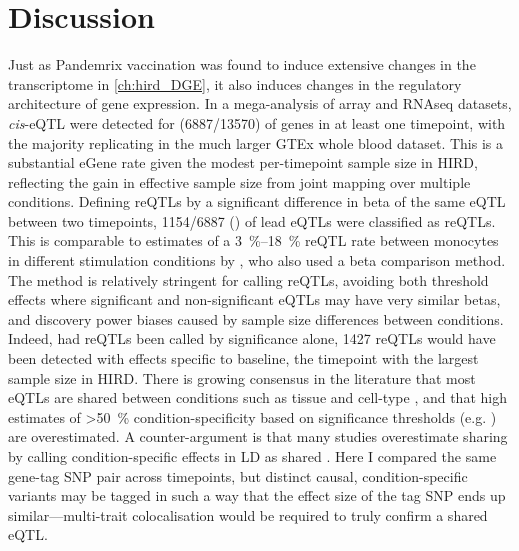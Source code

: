 \section{Discussion}

Just as Pandemrix vaccination was found to induce extensive changes in the transcriptome
in \cref{ch:hird_DGE},
it also induces changes in the regulatory architecture of gene expression.
In a mega-analysis of array and \gls{RNAseq} datasets,
\textit{cis}-\gls{eQTL} were detected for  (\num{6887/13570}) of genes in at least one timepoint,
with the majority replicating in the much larger GTEx whole blood dataset.
This is a substantial eGene rate given the modest per-timepoint sample size in \gls{HIRD}, reflecting the gain in effective sample size from joint mapping over multiple conditions.
Defining \glspl{reQTL} by a significant difference in beta of the same \gls{eQTL} between two timepoints,
\num{1154/6887} () of lead \glspl{eQTL} were classified as \glspl{reQTL}.
This is comparable to estimates of a \SIrange{3}{18}{\percent} \gls{reQTL} rate between monocytes in different stimulation conditions by \textcite{kim-hellmuth2017GeneticRegulatoryEffects}, who also used a beta comparison method.
The method is relatively stringent for calling \glspl{reQTL},
avoiding both threshold effects where significant and non-significant \glspl{eQTL} may have very similar betas,
and discovery power biases caused by sample size differences between conditions.
Indeed, had \glspl{reQTL} been called by significance alone, 1427 \glspl{reQTL} would have been detected with effects specific to baseline, the timepoint with the largest sample size in \gls{HIRD}.
There is growing consensus in the literature that most \glspl{eQTL} are shared between conditions such as tissue and cell-type \autocite{ongen2017EstimatingCausalTissues,urbut2018FlexibleStatisticalMethods,kim-hellmuth2020CellTypeSpecific,umans2020WhereAreDiseaseAssociated},
and that high estimates of \SI{>50}{\percent} condition-specificity based on significance thresholds (e.g. \autocite{ackermann2013ImpactNaturalGenetic}) are overestimated.
A counter-argument is that many studies overestimate sharing by calling condition-specific effects in \gls{LD} as shared \autocite{umans2020WhereAreDiseaseAssociated}.
Here I compared the same gene-tag \gls{SNP} pair across timepoints,
but distinct causal, condition-specific variants may be tagged in such a way that the effect size of the tag \gls{SNP} ends up similar---multi-trait colocalisation would be required to truly confirm a shared \gls{eQTL}.

